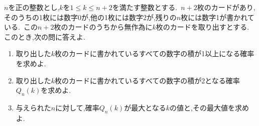 \begin{problem}
$n$を正の整数とし,$k$を$1 \leq k \leq n+2$を満たす整数とする.\, $n+2$枚のカードがあり,そのうちの1枚には数字0が,他の1枚には数字2が,残りの$n$枚には数字1が書かれている.\, この$n+2$枚のカードのうちから無作為に$k$枚のカードを取り出すとする.\, このとき,次の問に答えよ.
  \begin{enumerate}
    \item 取り出した$k$枚のカードに書かれているすべての数字の積が1以上になる確率を求めよ.
    \item 取り出した$k$枚のカードに書かれているすべての数字の積が2となる確率$Q_n(k)$を求めよ.
    \item 与えられた$n$に対して,確率$Q_n(k)$が最大となる$k$の値と,その最大値を求めよ.
  \end{enumerate}
\end{problem}

